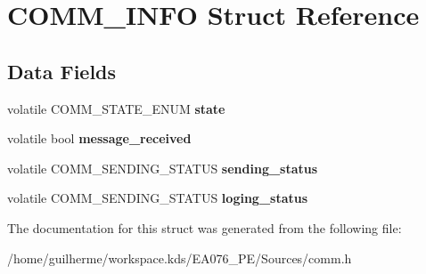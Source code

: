 \hypertarget{struct_c_o_m_m___i_n_f_o}{}\section{C\+O\+M\+M\+\_\+\+I\+N\+FO Struct Reference}
\label{struct_c_o_m_m___i_n_f_o}
\subsection*{Data Fields}
\begin{DoxyCompactItemize}
\item 
\mbox{\label{struct_c_o_m_m___i_n_f_o_a63761d79e4b9a9f4defef7674365b63f}} 
volatile C\+O\+M\+M\+\_\+\+S\+T\+A\+T\+E\+\_\+\+E\+N\+UM {\bfseries state}
\item 
\mbox{\label{struct_c_o_m_m___i_n_f_o_a9bc3a17736ef4c40eb60b063f3afbaaf}} 
volatile bool {\bfseries message\+\_\+received}
\item 
\mbox{\label{struct_c_o_m_m___i_n_f_o_ae57db5c167f0510fe69dd87edc985397}} 
volatile C\+O\+M\+M\+\_\+\+S\+E\+N\+D\+I\+N\+G\+\_\+\+S\+T\+A\+T\+US {\bfseries sending\+\_\+status}
\item 
\mbox{\label{struct_c_o_m_m___i_n_f_o_aa9ee058426995dbb0802dff9ccd12420}} 
volatile C\+O\+M\+M\+\_\+\+S\+E\+N\+D\+I\+N\+G\+\_\+\+S\+T\+A\+T\+US {\bfseries loging\+\_\+status}
\end{DoxyCompactItemize}


The documentation for this struct was generated from the following file\+:\begin{DoxyCompactItemize}
\item 
/home/guilherme/workspace.\+kds/\+E\+A076\+\_\+\+P\+E/\+Sources/comm.\+h\end{DoxyCompactItemize}
